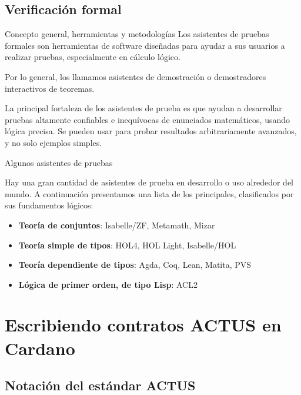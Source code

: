 \documentclass{beamer}
\begin{document}
\subsection{Verificación formal}

\begin{frame}{Concepto general, herramientas y metodologías}
Los asistentes de pruebas formales son herramientas de software diseñadas para ayudar a sus usuarios a realizar pruebas, especialmente en cálculo lógico.

\medskip

Por lo general, los llamamos asistentes de demostración o demostradores interactivos de teoremas.

\medskip
\pause

La principal fortaleza de los asistentes de prueba es que ayudan a desarrollar pruebas altamente confiables e inequívocas de enunciados matemáticos, usando lógica precisa. Se pueden usar para probar resultados arbitrariamente avanzados, y no solo ejemplos simples.

\end{frame}

\begin{frame}{Algunos asistentes de pruebas}

Hay una gran cantidad de asistentes de prueba en desarrollo o uso alrededor del mundo. A
continuación presentamos una lista de los principales, clasificados por sus fundamentos lógicos:
\medskip
\pause

\begin{itemize}
    \item \textbf{Teoría de conjuntos}: Isabelle/ZF, Metamath, Mizar
    \item \textbf{Teoría simple de tipos}: HOL4, HOL Light, Isabelle/HOL
    \item \textbf{Teoría dependiente de tipos}: Agda, Coq, Lean, Matita, PVS
    \item \textbf{Lógica de primer orden, de tipo Lisp}: ACL2
\end{itemize}
\end{frame}

\section{Escribiendo contratos ACTUS en Cardano}

\subsection{Notación del estándar ACTUS}
\end{document}
